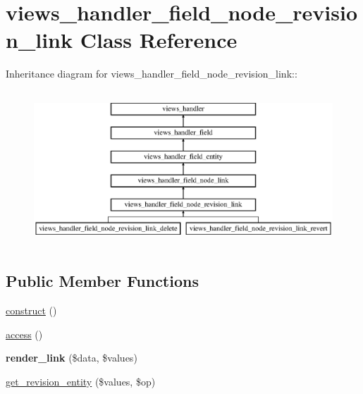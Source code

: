 \hypertarget{classviews__handler__field__node__revision__link}{
\section{views\_\-handler\_\-field\_\-node\_\-revision\_\-link Class Reference}
\label{classviews__handler__field__node__revision__link}
}
Inheritance diagram for views\_\-handler\_\-field\_\-node\_\-revision\_\-link::\begin{figure}[H]
\begin{center}
\leavevmode
\includegraphics[height=5.85366cm]{classviews__handler__field__node__revision__link}
\end{center}
\end{figure}
\subsection*{Public Member Functions}
\begin{DoxyCompactItemize}
\item 
\hyperlink{classviews__handler__field__node__revision__link_abebde82066efb55992015fcd460027ff}{construct} ()
\item 
\hyperlink{classviews__handler__field__node__revision__link_a29923ca97bbff1c87c0e9338ec972a07}{access} ()
\item 
\hypertarget{classviews__handler__field__node__revision__link_a47d6fa20075bd56571be5ddb5ba27b08}{
{\bfseries render\_\-link} (\$data, \$values)}
\label{classviews__handler__field__node__revision__link_a47d6fa20075bd56571be5ddb5ba27b08}

\item 
\hyperlink{classviews__handler__field__node__revision__link_a818745513ada7d807cfbd1c0f32e51b5}{get\_\-revision\_\-entity} (\$values, \$op)
\end{DoxyCompactItemize}


